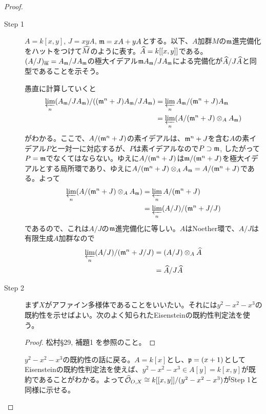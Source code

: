\begin{proof} ${}$
  \begin{description}
    \item[Step 1]   $A = k[x,y]$, $J= xy A$, $\mathfrak{m} = xA + yA$とする。以下、$A$加群$M$の$\mathfrak{m}$進完備化をハットをつけて$\widehat{M}$のように表す。$\widehat{A} = k[[x,y]]$である。
      $(A/J)_{\overline{\mathfrak{m}}} = A_{\mathfrak{m}} / J A_{\mathfrak{m}}$の極大イデアル$\mathfrak{m} A_{\mathfrak{m}}/ J A_{\mathfrak{m}}$による完備化が$\widehat{A}/J\widehat{A}$と同型であることを示そう。

      愚直に計算していくと
      \begin{align*}
    \operatorname*{\varprojlim}_{n} (A_{\mathfrak{m}} / J A_{\mathfrak{m}}) / ((\mathfrak{m}^n + J) A_{\mathfrak{m}}/ J A_{\mathfrak{m}})
    &= \operatorname*{\varprojlim}_{n} A_{\mathfrak{m}} / (\mathfrak{m}^n + J) A_{\mathfrak{m}} \\
    &= \operatorname*{\varprojlim}_{n} (A/(\mathfrak{m}^n + J) \otimes_A A_{\mathfrak{m}})
      \end{align*}
      がわかる。ここで、$A/ (\mathfrak{m}^n + J)$の素イデアルは、$\mathfrak{m}^n + J$を含む$A$の素イデアル$P$と一対一に対応するが、$P$は素イデアルなので$P \supset \mathfrak{m}$, したがって$P = \mathfrak{m}$でなくてはならない。ゆえに$A/ (\mathfrak{m}^n + J)$は$\mathfrak{m} / (\mathfrak{m}^n + J)$を極大イデアルとする局所環であり、ゆえに$A/(\mathfrak{m}^n + J) \otimes_A A_{\mathfrak{m}} = A/(\mathfrak{m}^n + J)$である。よって
      \begin{align*}
      \operatorname*{\varprojlim}_{n} (A/(\mathfrak{m}^n + J) \otimes_A A_{\mathfrak{m}}) &= \operatorname*{\varprojlim}_{n} A/(\mathfrak{m}^n + J) \\
      &= \operatorname*{\varprojlim}_{n} (A/J) / (\mathfrak{m}^n + J/ J )
      \end{align*}
      であるので、これは$A/J$の$\mathfrak{m}$進完備化に等しい。$A$はNoether環で、$A/J$は有限生成$A$加群なので
      \begin{align*}
        \operatorname*{\varprojlim}_{n} (A/J) / (\mathfrak{m}^n + J/ J ) &= (A/J) \otimes_A \widehat{A} \\
        &= \widehat{A} / J \widehat{A}
      \end{align*}
      \item[Step 2] まず$X$がアファイン多様体であることをいいたい。それには$y^2 -x^2 - x^3$の既約性を示せばよい。次のよく知られたEisensteinの既約性判定法を使う。
      \begin{proof}
        松村\cite{松村}\S 29, 補題1 を参照のこと。
      \end{proof}
      $y^2 -x^2 - x^3$の既約性の話に戻る。$A = k[x]$とし、$\mathfrak{p} = (x+1)$としてEisensteinの既約性判定法を使えば、$y^2 -x^2 - x^3 \in A[y]=k[x,y]$が既約であることがわかる。よって$\widehat{\mathcal{O}}_{O,X} \cong k[[x,y]]/ (y^2 - x^2 - x^3)$がStep 1と同様に示せる。
  \end{description}
\end{proof}




